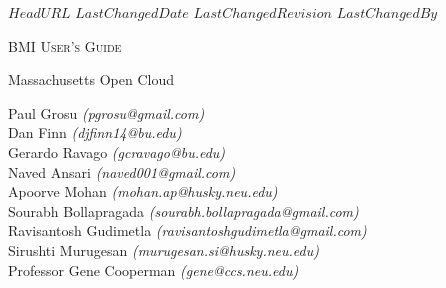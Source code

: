 \svnidlong
{$HeadURL$}
{$LastChangedDate$}
{$LastChangedRevision$}
{$LastChangedBy$}

\thispagestyle{titlepage}

\begin{center}
  \newlength{\parSepLength}
  \setlength{\parSepLength}{10ex}

  \Large
  \centering

  \thinRule\par
  \par\vspace{0.15\parSepLength}
  \begin{minipage}{\textwidth}
    \centering
    \fontsize{40pt}{36pt}\selectfont\titleColor\scshape
    BMI User's Guide
  \end{minipage}
  \par\vspace{0.25\parSepLength}
  \par\thinRule

  \vspace{0.125\parSepLength}

  \begin{minipage}{\textwidth}
    \centering
    \small
    Massachusetts Open Cloud
  \end{minipage}

  \vfill

  \begin{minipage}{\textwidth}
    \centering
    \Large
    Paul Grosu \emph{(pgrosu@gmail.com)} \\
    Dan Finn \emph{(djfinn14@bu.edu)} \\    
    Gerardo Ravago \emph{(gcravago@bu.edu)} \\
    Naved Ansari \emph{(naved001@gmail.com)} \\
    Apoorve Mohan \emph{(mohan.ap@husky.neu.edu)} \\    
    Sourabh Bollapragada \emph{(sourabh.bollapragada@gmail.com)} \\    
    Ravisantosh Gudimetla \emph{(ravisantoshgudimetla@gmail.com)} \\    
    Sirushti Murugesan \emph{(murugesan.si@husky.neu.edu)} \\    
    Professor Gene Cooperman \emph{(gene@ccs.neu.edu)} \\    
  \end{minipage}

  \vfill

  \begin{minipage}{0.8\textwidth}
    \centering
    \small


\end{minipage}
\end{center}
